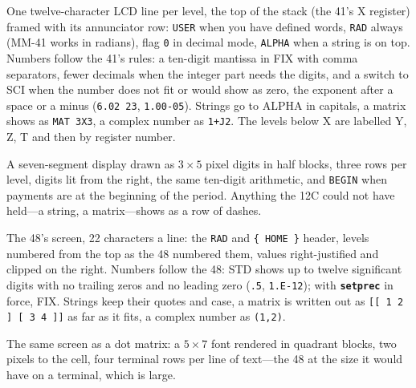 \documentclass[11pt,letterpaper]{article}
\newcommand{\code}[1]{\texttt{#1}}
\newcommand{\cmd}[1]{\texttt{\textbf{#1}}}
\begin{document}
\begin{description}[style=nextline,leftmargin=1.5em]
  \item[\code{hp41}] One twelve-character LCD line per level, the top of the stack (the 41's X register) framed with its annunciator row: \code{USER} when you have defined words, \code{RAD} always (MM-41 works in radians), flag \code{0} in decimal mode, \code{ALPHA} when a string is on top. Numbers follow the 41's rules: a ten-digit mantissa in FIX with comma separators, fewer decimals when the integer part needs the digits, and a switch to SCI when the number does not fit or would show as zero, the exponent after a space or a minus (\code{6.02 23}, \code{1.00-05}). Strings go to ALPHA in capitals, a matrix shows as \code{MAT 3X3}, a complex number as \code{1+J2}. The levels below X are labelled Y, Z, T and then by register number.
  \item[\code{hp12c}] A seven-segment display drawn as $3\times5$ pixel digits in half blocks, three rows per level, digits lit from the right, the same ten-digit arithmetic, and \code{BEGIN} when payments are at the beginning of the period. Anything the 12C could not have held---a string, a matrix---shows as a row of dashes.
  \item[\code{hp48}] The 48's screen, 22 characters a line: the \code{RAD} and \code{\{ HOME \}} header, levels numbered from the top as the 48 numbered them, values right-justified and clipped on the right. Numbers follow the 48: STD shows up to twelve significant digits with no trailing zeros and no leading zero (\code{.5}, \code{1.E-12}); with \cmd{setprec} in force, FIX. Strings keep their quotes and case, a matrix is written out as \code{[[ 1 2 ] [ 3 4 ]]} as far as it fits, a complex number as \code{(1,2)}.
  \item[\code{hp48px}] The same screen as a dot matrix: a $5\times7$ font rendered in quadrant blocks, two pixels to the cell, four terminal rows per line of text---the 48 at the size it would have on a terminal, which is large.
\end{description}
\end{document}
